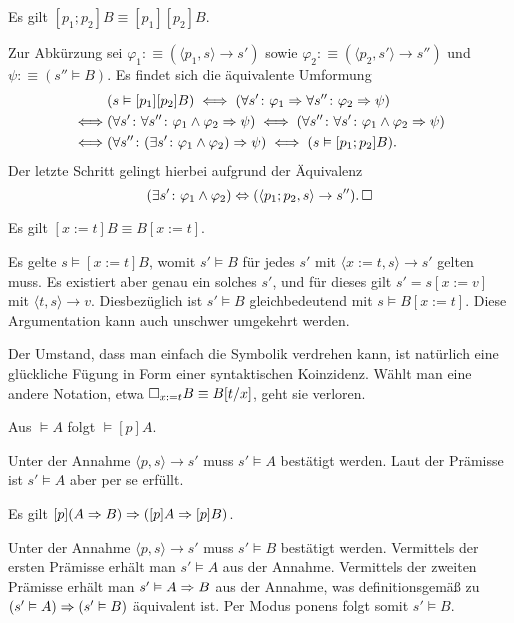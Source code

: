 \begin{Satz}
Es gilt $[p_1;p_2]B\equiv [p_1][p_2]B$.
\end{Satz}
\begin{Beweis}
Zur Abkürzung sei $\varphi_1:\equiv(\langle p_1,s\rangle\to s')$ sowie
$\varphi_2:\equiv(\langle p_2,s'\rangle\to s'')$ und $\psi:\equiv (s''\models B)$.
Es findet sich die äquivalente Umformung
\begin{align*}
&(s\vDash [p_1][p_2]B) \iff (\forall s'\colon\varphi_1\Rightarrow \forall s''\colon\varphi_2\Rightarrow\psi)\\
\iff &(\forall s'\colon\forall s''\colon\varphi_1\land\varphi_2\Rightarrow\psi)
\iff (\forall s''\colon\forall s'\colon\varphi_1\land\varphi_2\Rightarrow\psi)\\
\iff &(\forall s''\colon (\exists s'\colon\varphi_1\land\varphi_2)\Rightarrow\psi)
\iff (s\vDash [p_1;p_2]B).
\end{align*}
Der letzte Schritt gelingt hierbei aufgrund der Äquivalenz
\[(\exists s'\colon\varphi_1\land\varphi_2)\Leftrightarrow
(\langle p_1;p_2,s\rangle\to s'').\,\Box\]
\end{Beweis}

\begin{Satz}
Es gilt $[x:=t]B\equiv B[x:=t]$.
\end{Satz}
\begin{Beweis}
Es gelte $s\models [x:=t]B$, womit $s'\models B$ für jedes $s'$ mit
$\langle x:=t,s\rangle\to s'$ gelten muss. Es existiert aber genau ein
solches $s'$, und für dieses gilt $s'=s[x:=v]$ mit
$\langle t,s\rangle\to v$. Diesbezüglich ist $s'\models B$ gleichbedeutend
mit $s\models B[x:=t]$. Diese Argumentation kann auch
unschwer umgekehrt werden.\,\qedsymbol
\end{Beweis}

Der Umstand, dass man einfach die Symbolik verdrehen kann, ist natürlich
eine glückliche Fügung in Form einer syntaktischen Koinzidenz. Wählt man
eine andere Notation, etwa $\Box_{x:=t} B\equiv B[t/x]$, geht sie verloren.

\begin{Satz}\label{dl-nec}
Aus $\models A$ folgt $\models [p]A$.
\end{Satz}
\begin{Beweis}
Unter der Annahme $\langle p,s\rangle\to s'$ muss $s'\models A$ bestätigt
werden. Laut der Prämisse ist $s'\models A$ aber per se erfüllt.\,\qedsymbol
\end{Beweis}

\begin{Satz}\label{dl-K}
Es gilt $[p](A\Rightarrow B)\Rightarrow ([p]A\Rightarrow [p]B)$.
\end{Satz}
\begin{Beweis}
Unter der Annahme $\langle p,s\rangle\to s'$ muss $s'\models B$ bestätigt
werden. Vermittels der ersten Prämisse erhält man $s'\models A$ aus
der Annahme. Vermittels der zweiten Prämisse erhält man
$s'\vDash A\Rightarrow B$ aus der Annahme, was definitionsgemäß zu
$(s'\vDash A)\Rightarrow (s'\vDash B)$ äquivalent ist. Per Modus ponens
folgt somit $s'\models B$.\,\qedsymbol
\end{Beweis}

